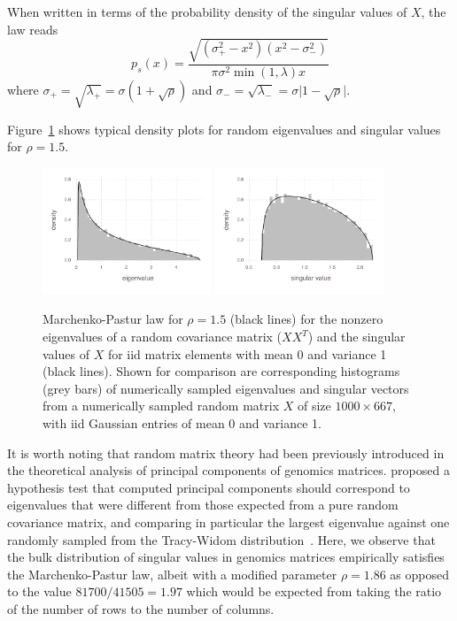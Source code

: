 \documentclass[review]{siamart0516}
\begin{document}
When written in terms of the probability density of the singular values of $X$,
the law reads
%
\begin{equation}
    p_s(x) = \frac {\sqrt{(\sigma_+^2-x^2)(x^2-\sigma_-^2)}} {\pi \sigma^2 \min(1, \lambda) x}
\end{equation}
%
where
$\sigma_+ = \sqrt{\lambda_+} = \sigma(1+\sqrt{\rho})$ and
$\sigma_- = \sqrt{\lambda_-} = \sigma\vert1-\sqrt{\rho}\vert$.

Figure~\ref{fig:mplaw} shows typical density plots for random eigenvalues
and singular values for $\rho=1.5$.

\begin{figure}
\caption{Marchenko-Pastur law for $\rho=1.5$ (black lines) for the nonzero
eigenvalues of a random covariance matrix ($XX^{T}$) and the singular
values of $X$ for iid matrix elements with mean 0 and variance 1
(black lines). Shown for comparison are corresponding histograms (grey
bars) of numerically sampled eigenvalues and singular vectors from
a numerically sampled random matrix $X$ of size $1000\times667$,
with iid Gaussian entries of mean 0 and variance 1.
\label{fig:mplaw}
}

\includegraphics[width=0.45\textwidth]{fig/mplaw/fig-mplaw-ev}
%
\includegraphics[width=0.45\textwidth]{fig/mplaw/fig-mplaw-sv}
\end{figure}


It is worth noting that random matrix theory had been previously introduced in
the theoretical analysis of principal components of genomics matrices.
\cite{Patterson2006} proposed a hypothesis test that computed principal components
should correspond to eigenvalues that were different from those expected from a
pure random covariance matrix,
and comparing in particular the largest eigenvalue against one randomly sampled
from the Tracy-Widom distribution~\cite{Tracy1993,Tracy1994}.
Here, we observe that the bulk distribution of singular values in genomics
matrices empirically satisfies the Marchenko-Pastur law, albeit with a
modified parameter $\rho = 1.86$ as opposed to the value $81700/41505=1.97$
which would be expected from taking the ratio of the number of rows to the
number of columns.
\end{document}
